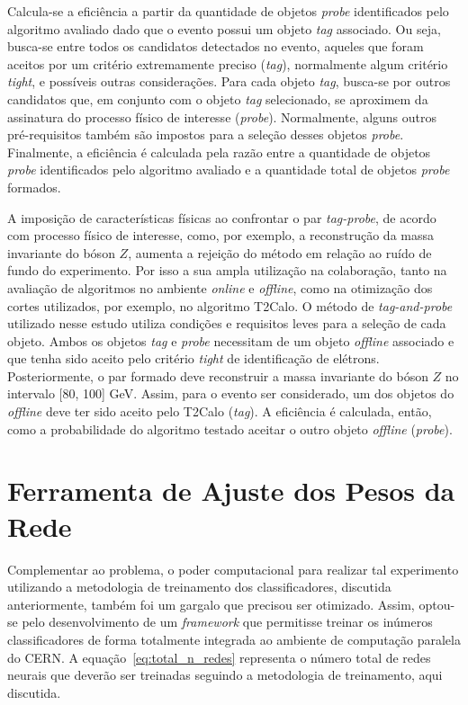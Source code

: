 Calcula-se a eficiência a partir da quantidade de objetos \textit{probe} identificados pelo algoritmo avaliado dado que o evento possui um objeto \textit{tag} associado. Ou seja, busca-se 
entre todos os candidatos detectados no evento, aqueles que foram aceitos por um critério extremamente preciso (\textit{tag}), normalmente algum critério \textit{tight}, e possíveis outras considerações. 
Para cada objeto \textit{tag}, busca-se por outros candidatos que, em conjunto com o objeto \textit{tag} selecionado, se aproximem da assinatura do processo físico de interesse (\textit{probe}). 
Normalmente, alguns outros pré-requisitos também são impostos para a seleção desses objetos \textit{probe}. Finalmente, a eficiência é calculada pela razão entre a quantidade de objetos 
\textit{probe} identificados pelo algoritmo avaliado e a quantidade total de objetos \textit{probe} formados.

A imposição de características físicas ao confrontar o par \textit{tag-probe}, de acordo com processo físico de interesse, como, por exemplo, a reconstrução da massa invariante do 
bóson $Z$, aumenta a rejeição do método em relação ao ruído de fundo do experimento. Por isso a sua ampla utilização na colaboração, tanto na avaliação de algoritmos no 
ambiente \textit{online} e \textit{offline}, como na otimização dos cortes utilizados, por exemplo, no algoritmo T2Calo. O método de \textit{tag-and-probe} utilizado nesse estudo utiliza condições e requisitos 
leves para a seleção de cada objeto. Ambos os objetos \textit{tag} e \textit{probe} necessitam de um objeto \textit{offline} associado e que tenha sido aceito pelo critério \textit{tight} de identificação de elétrons. 
Posteriormente, o par formado deve reconstruir a massa invariante do bóson $Z$ no intervalo [80, 100] GeV.  Assim, para o evento ser considerado, um 
dos objetos do \textit{offline} deve ter sido aceito pelo T2Calo (\textit{tag}). A eficiência é calculada, então, como a probabilidade do algoritmo testado aceitar o outro objeto \textit{offline} (\textit{probe}).


\section{Ferramenta de Ajuste dos Pesos da Rede}

Complementar ao problema, o poder computacional para realizar tal experimento utilizando a metodologia de treinamento dos classificadores,
discutida anteriormente, também foi um gargalo que precisou ser otimizado. Assim, optou-se pelo desenvolvimento de um \textit{framework}
que permitisse treinar os inúmeros classificadores de forma totalmente integrada ao ambiente de computação paralela do CERN.
A equação~\ref{eq:total_n_redes} representa o número total de redes neurais que deverão ser treinadas seguindo a metodologia de treinamento, aqui discutida.

